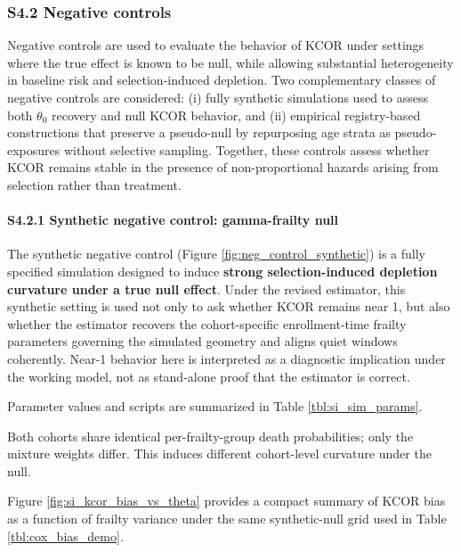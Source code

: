 \documentclass[
]{article}
\begin{document}
\subsubsection{S4.2 Negative controls}\label{s4.2-negative-controls}

Negative controls are used to evaluate the behavior of KCOR under
settings where the true effect is known to be null, while allowing
substantial heterogeneity in baseline risk and selection-induced
depletion. Two complementary classes of negative controls are
considered: (i) fully synthetic simulations used to assess both
\(\theta_0\) recovery and null KCOR behavior, and (ii) empirical
registry-based constructions that preserve a pseudo-null by repurposing
age strata as pseudo-exposures without selective sampling. Together,
these controls assess whether KCOR remains stable in the presence of
non-proportional hazards arising from selection rather than treatment.

\paragraph{S4.2.1 Synthetic negative control: gamma-frailty
null}\label{s4.2.1-synthetic-negative-control-gamma-frailty-null}

The synthetic negative control (Figure \ref{fig:neg_control_synthetic})
is a fully specified simulation designed to induce \textbf{strong
selection-induced depletion curvature under a true null effect}. Under
the revised estimator, this synthetic setting is used not only to ask
whether KCOR remains near 1, but also whether the estimator recovers the
cohort-specific enrollment-time frailty parameters governing the
simulated geometry and aligns quiet windows coherently. Near-1 behavior
here is interpreted as a diagnostic implication under the working model,
not as stand-alone proof that the estimator is correct.

Parameter values and scripts are summarized in Table
\ref{tbl:si_sim_params}.

Both cohorts share identical per-frailty-group death probabilities; only
the mixture weights differ. This induces different cohort-level
curvature under the null.

Figure \ref{fig:si_kcor_bias_vs_theta} provides a compact summary of
KCOR bias as a function of frailty variance under the same
synthetic-null grid used in Table \ref{tbl:cox_bias_demo}.
\end{document}

